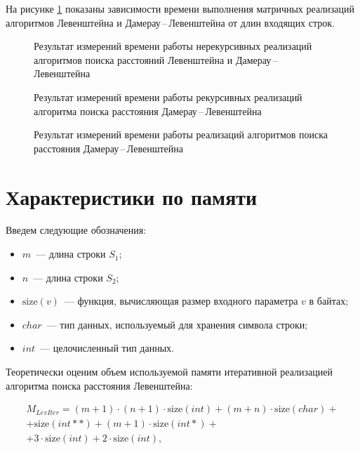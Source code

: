 На рисунке \ref{fig:nonrec-time} показаны зависимости времени выполнения матричных реализаций алгоритмов Левенштейна и Дамерау\,--\,Левенштейна от длин входящих строк.

\begin{figure}[H]
    \centering
    
    \caption{Результат измерений времени работы нерекурсивных реализаций алгоритмов поиска расстояний Левенштейна и Дамерау\,--\,Левенштейна}
    \label{fig:nonrec-time}
\end{figure}

\begin{figure}[H]
    \centering
    
    \caption{Результат измерений времени работы рекурсивных реализаций алгоритма поиска расстояния Дамерау\,--\,Левенштейна}
    \label{fig:rec-time}
\end{figure}

\begin{figure}[H]
    \centering
    
    \caption{Результат измерений времени работы реализаций алгоритмов поиска расстояния Дамерау\,--\,Левенштейна}
    \label{fig:dl-all-time}
\end{figure}

\section{Характеристики по памяти}

Введем следующие обозначения:

\begin{itemize}
    \item $m$~--- длина строки $S_1$;
    \item $n$~--- длина строки $S_2$;
    \item $\text{size}(v)$~--- функция, вычисляющая размер входного параметра $v$ в байтах;
    \item $char$~--- тип данных, используемый для хранения символа строки;
    \item $int$~--- целочисленный тип данных.
\end{itemize}

Теоретически оценим объем используемой памяти итеративной реа\-лизацией алгоритма поиска расстояния Левенштейна:

\begin{multline}
    M_{LevIter} = (m + 1) \cdot (n + 1) \cdot \text{size}(int) + (m + n) \cdot \text{size}(char) + \\
    + \text{size}(int**) + (m + 1) \cdot \text{size}(int*) + \\
    + 3 \cdot \text{size}(int) + 2 \cdot \text{size}(int),
\end{multline}

